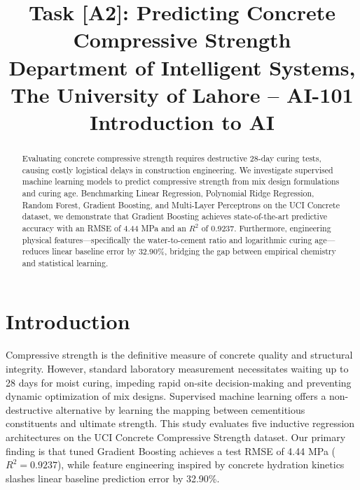 \documentclass[conference,10pt]{IEEEtran}
\begin{document}
\title{Task [A2]: Predicting Concrete Compressive Strength\\
\large Department of Intelligent Systems, The University of Lahore -- AI-101 Introduction to AI}

\author{
}

\maketitle

\begin{abstract}
Evaluating concrete compressive strength requires destructive 28-day curing tests, causing costly logistical delays in construction engineering. We investigate supervised machine learning models to predict compressive strength from mix design formulations and curing age. Benchmarking Linear Regression, Polynomial Ridge Regression, Random Forest, Gradient Boosting, and Multi-Layer Perceptrons on the UCI Concrete dataset, we demonstrate that Gradient Boosting achieves state-of-the-art predictive accuracy with an RMSE of 4.44 MPa and an $R^2$ of 0.9237. Furthermore, engineering physical features—specifically the water-to-cement ratio and logarithmic curing age—reduces linear baseline error by 32.90\%, bridging the gap between empirical chemistry and statistical learning.
\end{abstract}

\section{Introduction}
Compressive strength is the definitive measure of concrete quality and structural integrity. However, standard laboratory measurement necessitates waiting up to 28 days for moist curing, impeding rapid on-site decision-making and preventing dynamic optimization of mix designs. Supervised machine learning offers a non-destructive alternative by learning the mapping between cementitious constituents and ultimate strength. This study evaluates five inductive regression architectures on the UCI Concrete Compressive Strength dataset. Our primary finding is that tuned Gradient Boosting achieves a test RMSE of 4.44 MPa ($R^2 = 0.9237$), while feature engineering inspired by concrete hydration kinetics slashes linear baseline prediction error by 32.90\%.
\end{document}
